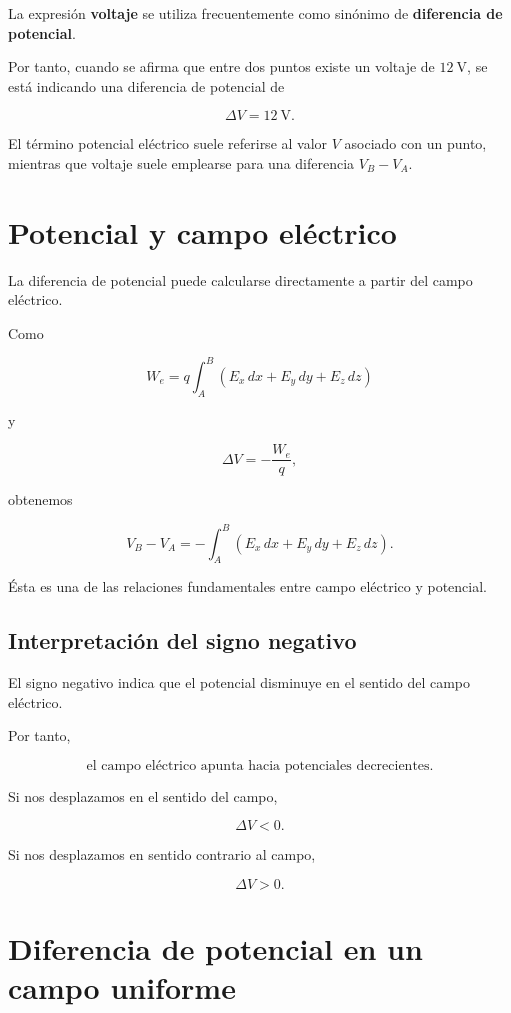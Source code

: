 La expresión \textbf{voltaje} se utiliza frecuentemente como sinónimo de
\textbf{diferencia de potencial}.

Por tanto, cuando se afirma que entre dos puntos existe un voltaje de
\(\SI{12}{\volt}\), se está indicando una diferencia de potencial de

\[
\Delta V=\SI{12}{\volt}.
\]

El término potencial eléctrico suele referirse al valor \(V\) asociado con un punto,
mientras que voltaje suele emplearse para una diferencia \(V_B-V_A\).


\section{Potencial y campo eléctrico}

La diferencia de potencial puede calcularse directamente a partir del campo eléctrico.

Como

\[
W_e
=
q\int_A^B
\left(
E_x\,dx+E_y\,dy+E_z\,dz
\right)
\]

y

\[
\Delta V=-\frac{W_e}{q},
\]

obtenemos

\begin{equation}
\boxed{
V_B-V_A
=
-\int_A^B
\left(
E_x\,dx+E_y\,dy+E_z\,dz
\right)
}.
\end{equation}

Ésta es una de las relaciones fundamentales entre campo eléctrico y potencial.


\subsection{Interpretación del signo negativo}

El signo negativo indica que el potencial disminuye en el sentido del campo eléctrico.

Por tanto,

\begin{equation}
\boxed{
\text{el campo eléctrico apunta hacia potenciales decrecientes}
}.
\end{equation}

Si nos desplazamos en el sentido del campo,

\[
\Delta V<0.
\]

Si nos desplazamos en sentido contrario al campo,

\[
\Delta V>0.
\]


\section{Diferencia de potencial en un campo uniforme}

